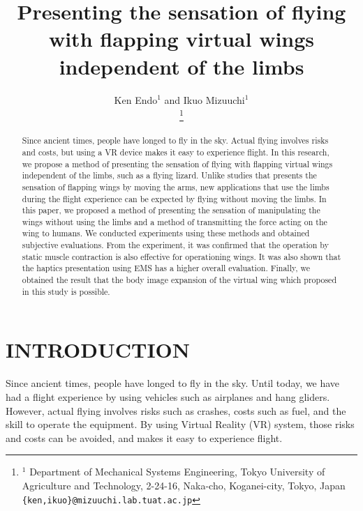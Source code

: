 \documentclass[letterpaper, 10 pt, conference]{ieeeconf}  %
\title{\LARGE \bf
        Presenting the sensation of flying with flapping virtual wings independent of the limbs
}
\author{Ken Endo$^{1}$ and Ikuo Mizuuchi$^{1}$%

        \thanks{$^{1}$ Department of Mechanical Systems Engineering, Tokyo University of Agriculture and Technology, 2-24-16, Naka-cho, Koganei-city, Tokyo, Japan
                {\tt\small \{ken,ikuo\}@mizuuchi.lab.tuat.ac.jp}}%
}
\begin{document}
\maketitle
\thispagestyle{empty}
\pagestyle{empty}


\begin{abstract}
        Since ancient times, people have longed to fly in the sky.  
        Actual flying involves risks and costs, but using a VR device makes it easy to experience flight.  
        In this research, we propose a method of presenting the sensation of flying with flapping virtual wings independent of the limbs, such as a flying lizard.  
        Unlike studies that presents the sensation of flapping wings by moving the arms, new applications that use the limbs during the flight experience can be expected by flying without moving the limbs.  
        In this paper, we proposed a method of presenting the sensation of manipulating the wings without using the limbs and a method of transmitting the force acting on the wing to humans.  
        We conducted experiments using these methods and obtained subjective evaluations.  
        From the experiment, it was confirmed that the operation by static muscle contraction is also effective for operationing wings.  
        It was also shown that the haptics presentation using EMS has a higher overall evaluation.  
        Finally, we obtained the result that the body image expansion of the virtual wing which proposed in this study is possible.
\end{abstract}


\section{INTRODUCTION}


        Since ancient times, people have longed to fly in the sky.  
        Until today, we have had a flight experience by using vehicles such as airplanes and hang gliders.  
        However, actual flying involves risks such as crashes, costs such as fuel, and the skill to operate the equipment.  
        By using Virtual Reality (VR) system, those risks and costs can be avoided, and makes it easy to experience flight.  
\end{document}
